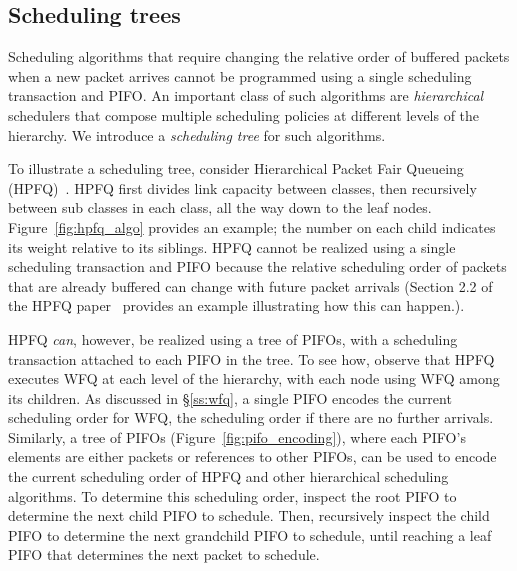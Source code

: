 
\subsection{Scheduling trees}
\label{ss:hpfq}

Scheduling algorithms that require changing the relative order of
buffered packets when a new packet arrives cannot be programmed using
a single scheduling transaction and PIFO. An important class of such
algorithms are {\em hierarchical} schedulers that compose multiple
scheduling policies at different levels of the hierarchy. We introduce
a {\em scheduling tree} for such algorithms.

To illustrate a scheduling tree, consider Hierarchical Packet Fair
Queueing (HPFQ)~\cite{hpfq}. HPFQ first divides link capacity between
classes, then recursively between sub classes in each class, all the
way down to the leaf nodes.  Figure~\ref{fig:hpfq_algo} provides an
example; the number on each child indicates its weight relative to its
siblings.  HPFQ cannot be realized using a single scheduling
transaction and PIFO because the relative scheduling order of packets
that are already buffered can change with future packet arrivals
(Section 2.2 of the HPFQ paper~\cite{hpfq} provides an example illustrating
how this can happen.).


HPFQ {\em can}, however, be realized using a tree of PIFOs, with a
scheduling transaction attached to each PIFO in the tree. To see how,
observe that HPFQ executes WFQ at each level of the hierarchy, with
each node using WFQ among its children. As discussed in
\S\ref{ss:wfq}, a single PIFO encodes the current scheduling order for
WFQ, \ie the scheduling order if there are no further
arrivals. Similarly, a tree of PIFOs (Figure~\ref{fig:pifo_encoding}),
where each PIFO's elements are either packets or references to other
PIFOs, can be used to encode the current scheduling order of HPFQ and
other hierarchical scheduling algorithms. To determine this scheduling
order, inspect the root PIFO to determine the next child PIFO to
schedule. Then, recursively inspect the child PIFO to determine the
next grandchild PIFO to schedule, until reaching a leaf PIFO that
determines the next packet to schedule.

